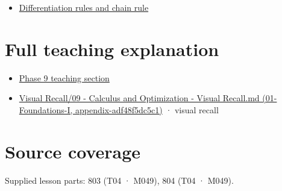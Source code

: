 \begin{itemize}
\tightlist
\item
  \hyperref[appendix-d9f70bdfbc92]{Differentiation rules and chain rule}
\end{itemize}

\section{Full teaching explanation}\label{appendix-fecc1847f5a3-full-teaching-explanation}

\begin{itemize}
\tightlist
\item
  \href{Continuous\%20Notes/Computing\%20Foundations\%20-\%20From\%20Bits\%20to\%20C++\%20and\%20Systems\%20APIs\#Functions,\%20limits,\%20continuity,\%20and\%20scalar\%20change}{Phase 9 teaching section}
\item
  \href{../01-Foundations-I/main.pdf\#nameddest=appendix-adf48f5dc5c1}{Visual Recall/09 - Calculus and Optimization - Visual Recall.md (01-Foundations-I, appendix-adf48f5dc5c1)} · visual recall
\end{itemize}

\section{Source coverage}\label{appendix-fecc1847f5a3-source-coverage}

Supplied lesson parts: 803 (T04 · M049), 804 (T04 · M049).
